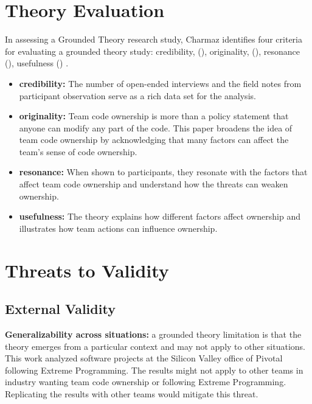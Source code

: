 \section{Theory Evaluation}
\label{TheoryEvaluation}

In assessing a Grounded Theory research study, Charmaz identifies four criteria for evaluating a grounded theory study: credibility, (), originality, (), resonance (), usefulness () \cite{StolGTinSE}. 

\begin{itemize}
\item 
\textbf{credibility:}  The number of open-ended interviews and the field notes from participant observation serve as a rich data set for the analysis. 

\item
\textbf{originality:} Team code ownership is more than a policy statement that anyone can modify any part of the code. This paper broadens the idea of team code ownership by acknowledging that many factors can affect the team’s sense of code ownership.

\item
\textbf{resonance:} When shown to participants, they resonate with the factors that affect team code ownership and understand how the threats can weaken ownership.

\item
\textbf{usefulness:} 
The theory explains how different factors affect ownership and illustrates how team actions can influence ownership. 
\end{itemize}

\section{Threats to Validity}

\subsection{External Validity}

\textbf{Generalizability across situations:} a grounded theory limitation is that the theory emerges from a particular context and may not apply to other situations. This work analyzed software projects at the Silicon Valley office of Pivotal following Extreme Programming. The results might not apply to other teams in industry wanting team code ownership or following Extreme Programming. Replicating the results with other teams would mitigate this threat. 

